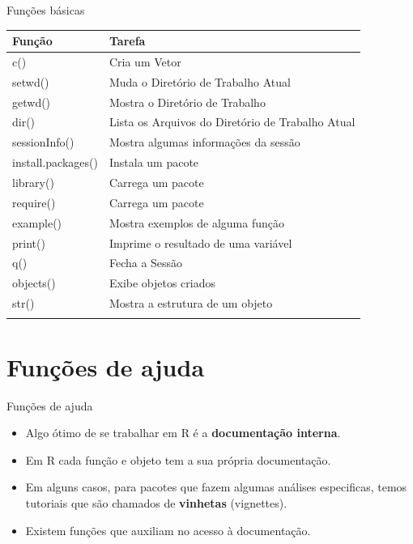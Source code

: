 \documentclass[
  ignorenonframetext,
  serif,
  professionalfont,
  usenames,
  dvipsnames,
  aspectratio = 169]{beamer}
\begin{document}
\begin{frame}{Funções básicas}
\label{funuxe7uxf5es-buxe1sicas-2}
\begin{longtable}[]{@{}
  >{\centering\arraybackslash}p{}
  >{\centering\arraybackslash}p{}@{}}
\toprule\noalign{}
\begin{minipage}[b]{\linewidth}\centering
Função
\end{minipage} & \begin{minipage}[b]{\linewidth}\centering
Tarefa
\end{minipage} \\
\midrule\noalign{}
\endhead
c() & Cria um Vetor \\
setwd() & Muda o Diretório de Trabalho Atual \\
getwd() & Mostra o Diretório de Trabalho \\
dir() & Lista os Arquivos do Diretório de Trabalho Atual \\
sessionInfo() & Mostra algumas informações da sessão \\
install.packages() & Instala um pacote \\
library() & Carrega um pacote \\
require() & Carrega um pacote \\
example() & Mostra exemplos de alguma função \\
print() & Imprime o resultado de uma variável \\
q() & Fecha a Sessão \\
objects() & Exibe objetos criados \\
str() & Mostra a estrutura de um objeto \\
\bottomrule\noalign{}
\end{longtable}
\end{frame}

\section{Funções de ajuda}\label{funuxe7uxf5es-de-ajuda}

\begin{frame}{Funções de ajuda}
\label{funuxe7uxf5es-de-ajuda-1}
\begin{itemize}
\item
  Algo ótimo de se trabalhar em R é a \textbf{documentação interna}.
\item
  Em R cada função e objeto tem a sua própria documentação.
\item
  Em alguns casos, para pacotes que fazem algumas análises especificas,
  temos tutoriais que são chamados de \textbf{vinhetas} (vignettes).
\item
  Existem funções que auxiliam no acesso à documentação.
\end{itemize}
\end{frame}
\end{document}
